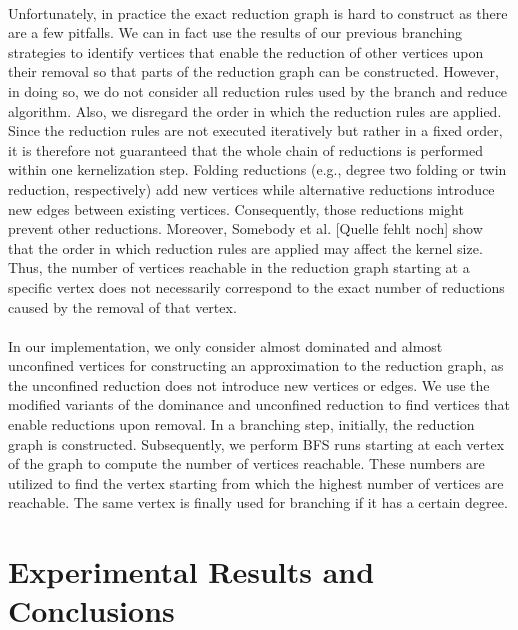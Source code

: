\documentclass[]{article}
\begin{document}
\paragraph{}
Unfortunately, in practice the exact reduction graph is hard to construct as there are a few pitfalls. We can in fact use the results of our previous branching strategies to identify vertices that enable the reduction of other vertices upon their removal so that parts of the reduction graph can be constructed. However, in doing so, we do not consider all reduction rules used by the branch and reduce algorithm. Also, we disregard the order in which the reduction rules are applied. Since the reduction rules are not executed iteratively but rather in a fixed order, it is therefore not guaranteed that the whole chain of reductions is performed within one kernelization step. Folding reductions (e.g., degree two folding or twin reduction, respectively) add new vertices while alternative reductions introduce new edges between existing vertices. Consequently, those reductions might prevent other reductions. Moreover, Somebody et al. [Quelle fehlt noch] show that the order in which reduction rules are applied may affect the kernel size. Thus, the number of vertices reachable in the reduction graph starting at a specific vertex does not necessarily correspond to the exact number of reductions caused by the removal of that vertex.

\paragraph{}
In our implementation, we only consider almost dominated and almost unconfined vertices for constructing an approximation to the reduction graph, as the unconfined reduction does not introduce new vertices or edges. We use the modified variants of the dominance and unconfined reduction to find vertices that enable reductions upon removal. In a branching step, initially, the reduction graph is constructed. Subsequently, we perform BFS runs starting at each vertex of the graph to compute the number of vertices reachable. These numbers are utilized to find the vertex starting from which the highest number of vertices are reachable. The same vertex is finally used for branching if it has a certain degree.

\newpage
\section{Experimental Results and Conclusions} \label{sec5}
\newpage
\end{document}
